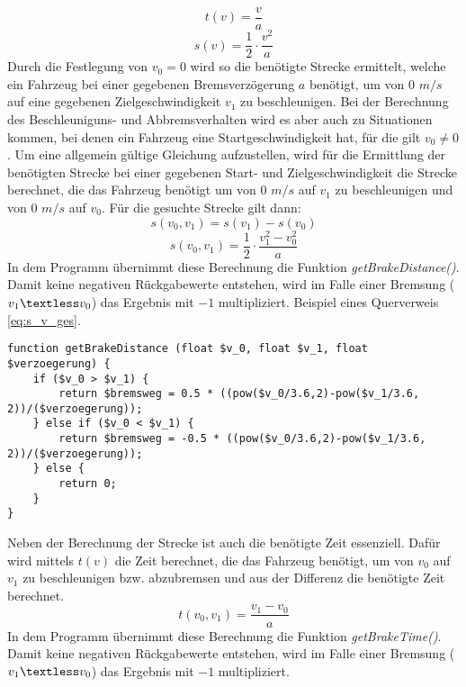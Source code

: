 \begin{equation}
t(v) = \frac{v}{a}
\end{equation}
\begin{equation}
s(v) =\frac{1}{2} \cdot \frac{v^{2}}{a}
\end{equation}
Durch die Festlegung von $v_{0} = 0$ wird so die benötigte Strecke ermittelt, welche ein Fahrzeug bei einer gegebenen Bremsverzögerung $a$ benötigt, um von 0 $m/s$ auf eine gegebenen Zielgeschwindigkeit $v_{1}$ zu beschleunigen. Bei der Berechnung des Beschleuniguns- und Abbremsverhalten wird es aber auch zu Situationen kommen, bei denen ein Fahrzeug eine Startgeschwindigkeit hat, für die gilt $v_{0} \neq 0$. Um eine allgemein gültige Gleichung aufzustellen, wird für die Ermittlung der benötigten Strecke bei einer gegebenen Start- und Zielgeschwindigkeit die Strecke berechnet, die das Fahrzeug benötigt um von 0 $m/s$ auf $v_{1}$ zu beschleunigen und von 0 $m/s$ auf $v_{0}$. Für die gesuchte Strecke gilt dann: 
\begin{equation}
s(v_{0}, v_{1}) = s(v_{1}) - s(v_{0}) 
\end{equation}
\begin{equation}
\label{eq:s_v_ges}
s(v_{0}, v_{1}) =\frac{1}{2} \cdot \frac{v_{1}^{2} - v_{0}^{2}}{a}
\end{equation}
In dem Programm übernimmt diese Berechnung die Funktion \textit{getBrakeDistance()}. Damit keine negativen Rückgabewerte entstehen, wird im Falle einer Bremsung ($v_{1} \textless v_{0}$) das Ergebnis mit $-1$ multipliziert. Beispiel eines Querverweis \eqref{eq:s_v_ges}.
\begin{lstlisting}
function getBrakeDistance (float $v_0, float $v_1, float $verzoegerung) {
	if ($v_0 > $v_1) {
		return $bremsweg = 0.5 * ((pow($v_0/3.6,2)-pow($v_1/3.6, 2))/($verzoegerung));
	} else if ($v_0 < $v_1) {
		return $bremsweg = -0.5 * ((pow($v_0/3.6,2)-pow($v_1/3.6, 2))/($verzoegerung));
	} else {
		return 0;
	}
}
\end{lstlisting}
Neben der Berechnung der Strecke ist auch die benötigte Zeit essenziell. Dafür wird mittels $t(v)$ die Zeit berechnet, die das Fahrzeug benötigt, um von $v_{0}$ auf $v_{1}$ zu beschleunigen bzw. abzubremsen und aus der Differenz die benötigte Zeit berechnet.
\begin{equation}
t(v_{0}, v_{1}) = \frac{v_{1} - v_{0}}{a}
\end{equation}
In dem Programm übernimmt diese Berechnung die Funktion \textit{getBrakeTime()}. Damit keine negativen Rückgabewerte entstehen, wird im Falle einer Bremsung ($v_{1} \textless v_{0}$) das Ergebnis mit $-1$ multipliziert.
